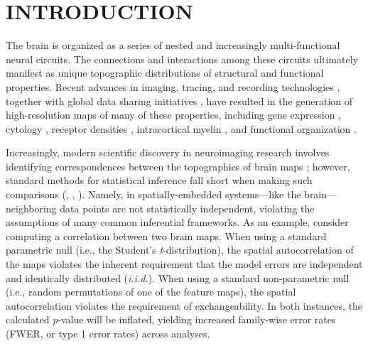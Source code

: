 \documentclass[12pt,aps,pra,reprint,showkeys]{revtex4-1}
\newcommand{\nimg}[1]{\textcolor{black}{{#1}}}
\begin{document}

\maketitle

\section*{INTRODUCTION}

The brain is organized as a series of nested and increasingly multi-functional neural circuits.
The connections and interactions among these circuits ultimately manifest as unique topographic distributions of structural and functional properties.
Recent advances in imaging, tracing, and recording technologies \citep{insel2013science}, together with global data sharing initiatives \citep{vanessen2013neuroimage, poldrack2013frontneuroinf, sudlow2015plosmed, casey2018devcogneuro}, have resulted in the generation of high-resolution maps of many of these properties, including gene expression \citep{hawrylycz2012nature, akbarian2015nature}, cytology \citep{voneconomo1925cytoarchitecture, scholtens2018neuroimage}, receptor densities \citep{beliveau2017jneuro, norgaard2020biorxiv, zilles2004janatomy, zilles2009curropneuro}, intracortical myelin \citep{burt2018natneuro, whitakervertes2016pnas}, and functional organization \citep{murray2014natneuro, yeo2011organization, shafiei2020elife, margulies2016pnas, damoiseaux2006pnas, bellec2010neuroimage}.

Increasingly, modern scientific discovery in neuroimaging research involves identifying correspondences between the topographies of brain maps \citep{baum2020pnas, vazquezrodriguez2019pnas, wang2019sciadvances, shafiei2020elife, gao2020biorxiv, demirtas2019neuron, hansen2020biorxiv}; however, standard methods for statistical inference fall short when making such comparisons (\citealt{alexander2013convergence, alexanderbloch2018neuroimage}, \nimg{\citealt{breakspear2004spatiotemporal}}, \citealt{burt2020neuroimage, fulcher2020biorxiv, gordon2016cercor}).
Namely, in spatially-embedded systems---like the brain---neighboring data points are not statistically independent, violating the assumptions of many common inferential frameworks.
As an example, consider computing a correlation between two brain maps.
When using a standard parametric null (i.e., the Student's \textit{t}-distribution), the spatial autocorrelation of the maps violates the inherent requirement that the model errors are independent and identically distributed (\textit{i.i.d.}).
When using a standard non-parametric null (i.e., random permutations of one of the feature maps), the spatial autocorrelation violates the requirement of exchangeability.
In both instances, the calculated \emph{p}-value will be inflated, yielding increased family-wise error rates (FWER, or type 1 error rates) across analyses.
\end{document}
